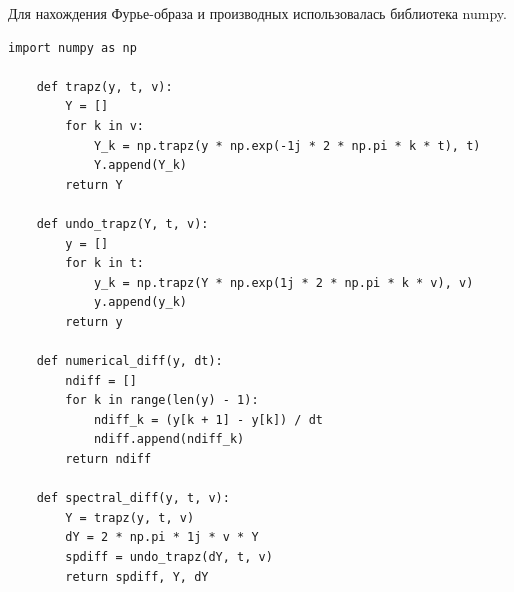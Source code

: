 \documentclass[a4paper, 12pt]{article}
\begin{document}
    \newpage
    Для нахождения Фурье-образа и производных использовалась библиотека numpy.
    \begin{lstlisting}[label=task1_2, caption={Программа для вычисления Фурье-образа численным интегрированием и производных.}]
    import numpy as np

    def trapz(y, t, v):
        Y = []
        for k in v:
            Y_k = np.trapz(y * np.exp(-1j * 2 * np.pi * k * t), t)
            Y.append(Y_k)
        return Y

    def undo_trapz(Y, t, v):
        y = []
        for k in t:
            y_k = np.trapz(Y * np.exp(1j * 2 * np.pi * k * v), v)
            y.append(y_k)
        return y

    def numerical_diff(y, dt):
        ndiff = []
        for k in range(len(y) - 1):
            ndiff_k = (y[k + 1] - y[k]) / dt
            ndiff.append(ndiff_k)
        return ndiff

    def spectral_diff(y, t, v):
        Y = trapz(y, t, v)
        dY = 2 * np.pi * 1j * v * Y
        spdiff = undo_trapz(dY, t, v)
        return spdiff, Y, dY
    \end{lstlisting}
\end{document}
